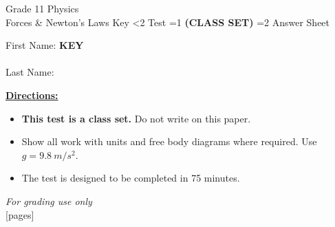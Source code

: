 \documentclass[addpoints]{exam}
\newcommand{\event}{Forces \& Newton's Laws}
\newcommand{\tournament}{}
\def\type{0}
\begin{document}
\begin{center}
    {\huge Grade 11 Physics \\ \event
    \ifprintanswers \space Key
    \else \space \ifnum\type<2 Test \fi \ifnum\type=1 \textbf{(CLASS SET)} \fi
          \ifnum\type=2 Answer Sheet \fi
    \fi \\ \vspace{3mm}\tournament\vspace{1mm}}
\end{center}

\vspace{.25\textheight}

\begin{center}
    First Name: \ifprintanswers
    \underline{\hspace{3.5cm}}\textbf{KEY}\underline{\hspace{5.5cm}}\\\vspace{5mm}
    \else \underline{\hspace{10cm}}\\ \vspace{5mm} \fi
    Last Name: \underline{\hspace{10cm}}\\ \vspace{5mm}
\end{center}

\noindent\textbf{\underline{Directions:}}
\begin{itemize}
    \ifnum\type=1 \item \textbf{This test is a class set.} Do not write on this paper. \fi
    \item Show all work with units and free body diagrams where required.
    Use $g = \SI{9.8}{m/s^2}$.
    \item The test is designed to be completed in 75 minutes.
\end{itemize}
\begin{center}
\textit{For grading use only}\\
[pages]
\end{center}
\end{document}
